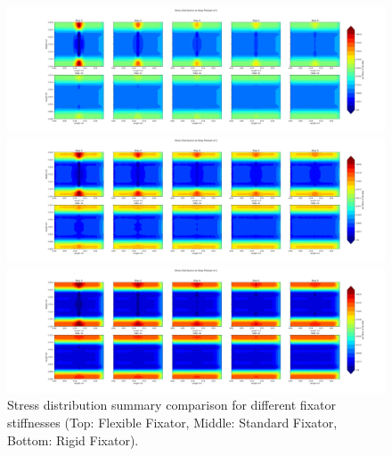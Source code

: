 \documentclass{article}
\begin{document}
\begin{figure}[H]
  \centering
  \begin{minipage}{\textwidth}
    \centering
    \includegraphics[width=\textwidth]{../output_advanced/Flexible/stress_summary.png}
  \end{minipage}

  \begin{minipage}{\textwidth}
    \centering
    \includegraphics[width=\textwidth]{../output_advanced/Standard/stress_summary.png}
  \end{minipage}

  \begin{minipage}{\textwidth}
    \centering
    \includegraphics[width=\textwidth]{../output_advanced/Rigid/stress_summary.png}
  \end{minipage}

  \caption{Stress distribution summary comparison for different fixator stiffnesses (Top: Flexible Fixator, Middle: Standard Fixator, Bottom: Rigid Fixator).}
  \label{fig:stress_summary_comparison}
\end{figure}
\end{document}
